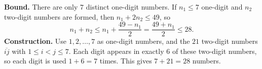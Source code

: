 \textbf{Bound.} There are only $7$ distinct one-digit numbers. If $n_1\le7$ one-digit and $n_2$ two-digit numbers are formed, then $n_1+2n_2\le49$, so
\[
n_1+n_2\le n_1+\dfrac{49-n_1}{2}=\dfrac{49+n_1}{2}\le28 .
\]
\textbf{Construction.} Use $1,2,\dots,7$ as one-digit numbers, and the $21$ two-digit numbers $\overline{ij}$ with $1\le i<j\le7$. Each digit appears in exactly $6$ of these two-digit numbers, so each digit is used $1+6=7$ times. This gives $7+21=\boxed{28}$ numbers.
